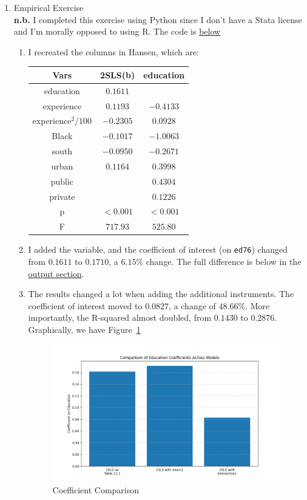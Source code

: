 \documentclass[10pt]{article}
\begin{document}
\begin{enumerate}
	\item Empirical Exercise \\ \textbf{n.b.} I completed this exercise using Python since I don't have a Stata license and I'm morally opposed to using R. The code is \href{code}{below} \begin{enumerate} \item I recreated the columns in Hansen, which are: \begin{center} \begin{tabular}{c|c|c} Vars & 2SLS(b) & education \\\hline education & $0.1611$ &\\experience &$0.1193$ & $-0.4133$\\ experience$^2 / 100$ &$-0.2305$ & $0.0928$ \\ Black &$-0.1017$ &$-1.0063$\\ south &$-0.0950$ &$-0.2671$\\ urban &$0.1164$ & $0.3998$\\ public & & $0.4304$ \\ private & & $0.1226$ \\ p & $< 0.001$ & $< 0.001$ \\ F &$717.93$ & $525.80$ \end{tabular}\end{center} \item I added the variable, and the coefficient of interest (on \texttt{ed76}) changed from $0.1611$ to $0.1710$, a $6.15\%$ change. The full difference is below in the \href{output}{output section}. \item The results changed a lot when adding the additional instruments. The coefficient of interest moved to $0.0827$, a change of $48.66\%$. More importantly, the R-squared almost doubled, from $0.1430$ to $0.2876$. Graphically, we have Figure~\ref{fig} \begin{figure}[H]\centering \includegraphics[width=10cm]{ps3_code/education_coefficients.png}\caption{Coefficient Comparison}\label{fig}\end{figure}\end{enumerate}
\end{enumerate}
\end{document}
